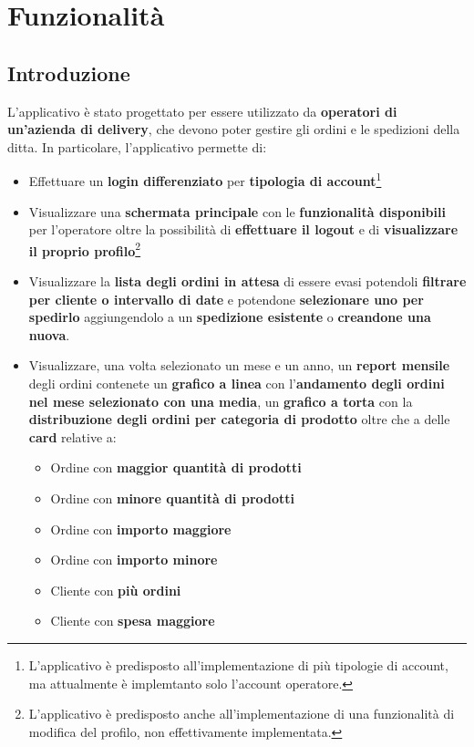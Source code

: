 \chapter{Funzionalità}

\section{Introduzione}

L'applicativo è stato progettato per essere utilizzato da \textbf{operatori di un'azienda di delivery},
che devono poter gestire gli ordini e le spedizioni della ditta. In particolare, l'applicativo
permette di:

\begin{itemize}
  \item Effettuare un \textbf{login differenziato} per \textbf{tipologia di account}\footnote{L'applicativo è predisposto
  all'implementazione di più tipologie di account, ma attualmente è implemtanto solo l'account operatore.}
  \item Visualizzare una \textbf{schermata principale} con le \textbf{funzionalità disponibili}
  per l'operatore oltre la possibilità di \textbf{effettuare il logout} e di 
  \textbf{visualizzare il proprio profilo}\footnote{L'applicativo è predisposto anche all'implementazione di una funzionalità di modifica del profilo, non effettivamente implementata.}
  \item Visualizzare la \textbf{lista degli ordini in attesa} di essere evasi potendoli \textbf{filtrare
  per cliente o intervallo di date} e potendone \textbf{selezionare uno per spedirlo} aggiungendolo
  a un \textbf{spedizione esistente} o \textbf{creandone una nuova}.
  \item Visualizzare, una volta selezionato un mese e un anno, un \textbf{report mensile} degli ordini
  contenete un \textbf{grafico a linea} con l'\textbf{andamento degli ordini nel mese selezionato con una media},
  un \textbf{grafico a torta} con la \textbf{distribuzione degli ordini per categoria di prodotto} oltre che a delle
  \textbf{card} relative a:
  \begin{itemize}
    \item Ordine con \textbf{maggior quantità di prodotti}
    \item Ordine con \textbf{minore quantità di prodotti}
    \item Ordine con \textbf{importo maggiore}
    \item Ordine con \textbf{importo minore}
    \item Cliente con \textbf{più ordini}
    \item Cliente con \textbf{spesa maggiore}
  \end{itemize}
\end{itemize}

